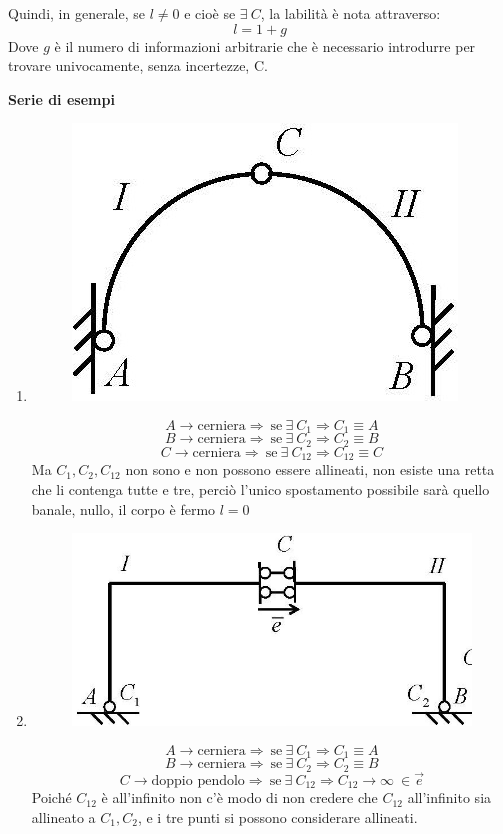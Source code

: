 \documentclass{article}
\begin{document}
\begin{adjustwidth}{2in}{}
Quindi, in generale, se $l \ne 0$ e cioè se $\exists ~ C$, la labilità è nota attraverso:
\[
l = 1 + g
\]
Dove $g$ è il numero di informazioni arbitrarie che è necessario introdurre per trovare univocamente, senza incertezze, C. \newline


\textbf{Serie di esempi} \newline

\begin{enumerate}

\item \mbox{}

\begin{figure}[H]
	\centering
	\includegraphics[width=0.15\linewidth]{immagini/1.PARTE3_Pagina_15 (2)}
\end{figure}
\[
A \rightarrow \text{cerniera} \Rightarrow ~ \text{se} ~ \exists ~ C_1 \Rightarrow C_1 \equiv A
\]
\[
B \rightarrow \text{cerniera} \Rightarrow ~ \text{se} ~ \exists ~ C_2 \Rightarrow C_2 \equiv B
\]
\[
C \rightarrow \text{cerniera} \Rightarrow ~ \text{se} ~ \exists ~ C_{12} \Rightarrow C_12 \equiv C
\]
Ma $C_1, C_2, C_{12}$ non sono e non possono essere allineati, non esiste una retta che li contenga tutte e tre, perciò l'unico spostamento possibile sarà quello banale, nullo, il corpo è fermo $l=0$ \newline

\item \mbox{}

\begin{figure}[H]
	\centering
	\includegraphics[width=0.25\linewidth]{immagini/1.PARTE3_Pagina_15}
\end{figure}
\[
A \rightarrow \text{cerniera} \Rightarrow ~ \text{se} ~ \exists ~ C_1 \Rightarrow C_1 \equiv A
\]
\[
B \rightarrow \text{cerniera} \Rightarrow ~ \text{se} ~ \exists ~ C_2 \Rightarrow C_2 \equiv B
\]
\[
C \rightarrow \text{doppio pendolo} \Rightarrow ~ \text{se} ~ \exists ~ C_{12} \Rightarrow C_12 \rightarrow \infty ~ \in \vec{e}
\]
Poiché  $C_{12}$ è all'infinito non c'è modo di non credere che $C_{12}$ all'infinito sia allineato a $C_1, C_2$, e i tre punti si possono considerare allineati. 


\end{enumerate}
\end{adjustwidth}
\end{document}
